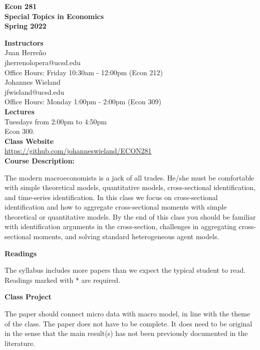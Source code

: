 \documentclass [12pt]{article}
\begin{document}
\begin{center}
\textbf{Econ 281\\
Special Topics in Economics\\
Spring 2022}
\end{center}


\noindent \textbf{Instructors} \\
Juan Herre\~no\\ 
jherrenolopera@ucsd.edu\\
Office Hours: Friday 10:30am - 12:00pm (Econ 212)\\

\noindent Johannes Wieland\\ 
jfwieland@ucsd.edu\\
Office Hours: Monday 1:00pm - 2:00pm  (Econ 309)\\


\noindent \textbf{Lectures} \\
Tuesdays from 2:00pm to 4:50pm \\
Econ 300.\\

\noindent \textbf{Class Website} \\
\href{https://github.com/johanneswieland/ECON281}{https://github.com/johanneswieland/ECON281} \\


\noindent \textbf{Course Description:} 

The modern macroeconomists is a jack of all trades. He/she must be comfortable with simple theoretical models, quantitative models, cross-sectional identification, and time-series identification. In this class we focus on cross-sectional identification and how to aggregate cross-sectional moments with simple theoretical or quantitative models. By the end of this class you should be familiar with identification arguments in the cross-section, challenges in aggregating cross-sectional moments, and solving standard heterogeneous agent models.



\noindent  \textbf{Readings}



\noindent The syllabus includes more papers than we expect the typical student to read. Readings marked with * are required.


\noindent  \textbf{Class Project}

The paper should connect micro data with macro model, in line with the theme of the class. The paper does not have to be complete. It does need to be original in the sense that the main result(s) has not been previously documented in the literature.
\end{document}
